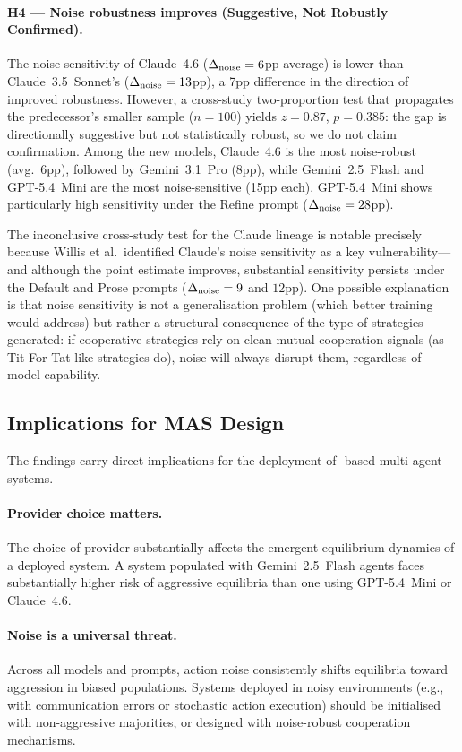 \paragraph{H4 — Noise robustness improves (\textcolor{red!70!black}{Suggestive, Not Robustly Confirmed}).}
The noise sensitivity of Claude~4.6 ($\Delta_{\mathrm{noise}} = 6$pp average) is lower than
Claude~3.5~Sonnet's ($\Delta_{\mathrm{noise}} = 13$pp), a 7pp difference in the direction of
improved robustness. However, a cross-study two-proportion test that propagates
the predecessor's smaller sample ($n = 100$) yields $z = 0.87$, $p = 0.385$:
the gap is directionally suggestive but not statistically robust, so we do not
claim confirmation.
Among the new models, Claude~4.6 is the most noise-robust (avg.\ 6pp),
followed by Gemini~3.1~Pro (8pp), while Gemini~2.5~Flash and GPT-5.4~Mini
are the most noise-sensitive (15pp each). GPT-5.4~Mini shows particularly
high sensitivity under the Refine prompt ($\Delta_{\mathrm{noise}} = 28$pp).

The inconclusive cross-study test for the Claude lineage is notable precisely because Willis et al.\
identified Claude's noise sensitivity as a key vulnerability---and although the
point estimate improves, substantial sensitivity persists under the Default and
Prose prompts ($\Delta_{\mathrm{noise}} = 9$ and $12$pp). One possible
explanation is that noise sensitivity is not a generalisation problem (which
better training would address) but rather a structural consequence of the
type of strategies generated: if cooperative strategies rely on clean mutual
cooperation signals (as Tit-For-Tat-like strategies do), noise will always
disrupt them, regardless of model capability.

\subsection{Implications for MAS Design}

The findings carry direct implications for the deployment of \LLM-based
multi-agent systems.

\paragraph{Provider choice matters.}
The choice of \LLM provider substantially
affects the emergent equilibrium dynamics of a deployed system. A system populated
with Gemini~2.5~Flash agents faces substantially higher risk of aggressive
equilibria than one using GPT-5.4~Mini or Claude~4.6.

\paragraph{Noise is a universal threat.}
Across all models and prompts,
action noise consistently shifts equilibria toward aggression in biased populations.
Systems deployed in noisy environments (e.g., with communication errors or
stochastic action execution) should be initialised with non-aggressive majorities,
or designed with noise-robust cooperation mechanisms.

